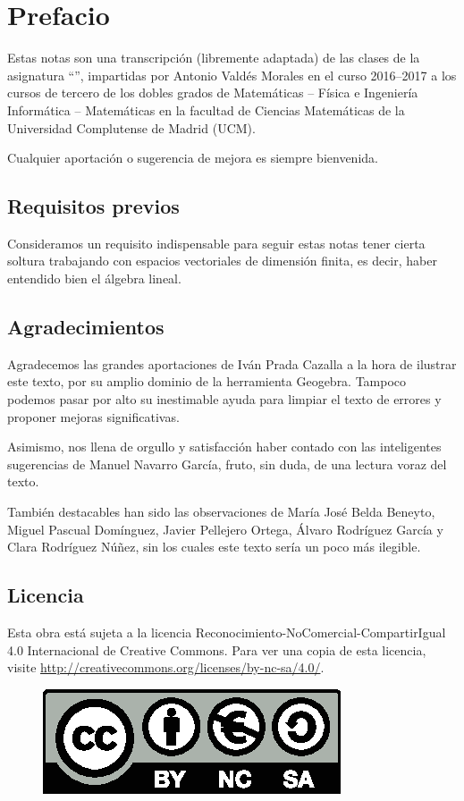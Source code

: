 \section*{Prefacio}
Estas notas son una transcripción (libremente adaptada) de las clases de la asignatura ``'', impartidas por Antonio Valdés Morales en el curso 2016--2017 a los cursos de tercero de los dobles grados de  Matemáticas -- Física e Ingeniería Informática -- Matemáticas en la facultad de Ciencias Matemáticas de la Universidad Complutense de Madrid (UCM).

Cualquier aportación o sugerencia de mejora es siempre bienvenida.
\subsection*{Requisitos previos}
Consideramos un requisito indispensable para seguir estas notas tener cierta soltura trabajando con espacios vectoriales de dimensión finita, es decir, haber entendido bien el álgebra lineal.

\subsection*{Agradecimientos}
Agradecemos las grandes aportaciones de Iván Prada Cazalla a la hora de ilustrar este texto, por su amplio dominio de la herramienta Geogebra. Tampoco podemos pasar por alto su inestimable ayuda para limpiar el texto de errores y proponer mejoras significativas.

Asimismo, nos llena de orgullo y satisfacción haber contado con las inteligentes sugerencias de Manuel Navarro García, fruto, sin duda, de una lectura voraz del texto.

También destacables han sido las observaciones de María José Belda Beneyto, Miguel Pascual Domínguez, Javier Pellejero Ortega, Álvaro Rodríguez García y Clara Rodríguez Núñez, sin los cuales este texto sería un poco más ilegible.
\subsection*{Licencia}
Esta obra está sujeta a la licencia Reconocimiento-NoComercial-CompartirIgual 4.0 Internacional de Creative Commons. Para ver una copia de esta licencia, visite \url{http://creativecommons.org/licenses/by-nc-sa/4.0/}.
\begin{figure}[h]
	\centering
	\includegraphics[scale=1]{Graficos/licencia.eps}
	\end{figure}